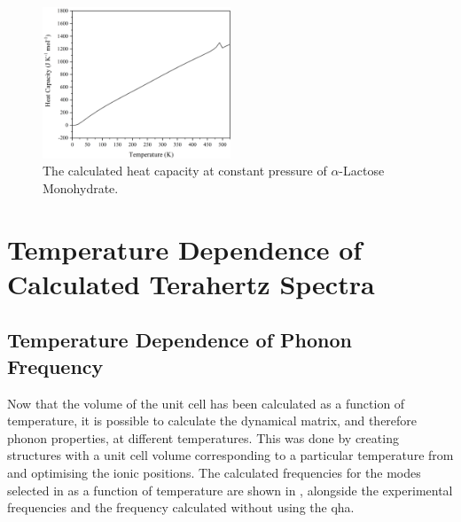 \begin{figure}
\centering
\includegraphics[width=0.5\textwidth]{Figures/Misc/QHA/CpG.png}
\captionsetup{font = footnotesize, justification = centering}
\caption[The Calculated Heat Capacity at Constant Pressure of \(\alpha\)-Lactose Monohydrate]{The calculated heat capacity at constant pressure of \(\alpha\)-Lactose Monohydrate.}
\label{fig:Cp}
\end{figure}

\section{Temperature Dependence of Calculated Terahertz Spectra}
\subsection{Temperature Dependence of Phonon Frequency}
Now that the volume of the unit cell has been calculated as a function of temperature, it is possible to calculate the dynamical matrix, and therefore phonon properties, at different temperatures. This was done by creating structures with a unit cell volume corresponding to a particular temperature from  and optimising the ionic positions. The calculated frequencies for the modes selected in  as a function of temperature are shown in , alongside the experimental frequencies and the frequency calculated without using the \acrshort{qha}.

